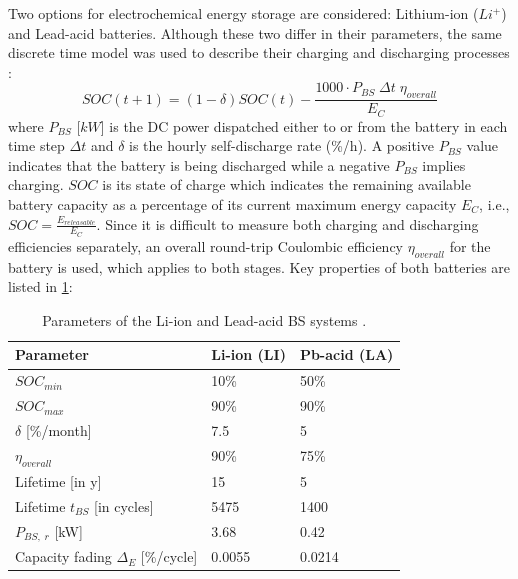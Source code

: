 \documentclass[final,3p,times]{elsarticle}
\begin{document}
Two options for electrochemical energy storage are considered: Lithium-ion ($Li^+$) and Lead-acid batteries. Although these two differ in their parameters, the same discrete time model was used to describe their charging and discharging processes \cite{tazvinga2014}:
\begin{equation}
    SOC(t+1) = (1-\delta) SOC(t) - \frac{1000 \cdot P_{BS} \; \Delta t \; \eta_{overall}}{E_C}
\end{equation}
where $P_{BS}$ [$kW$] is the DC power dispatched either to or from the battery in each time step $\Delta t$ and $\delta$ is the hourly self-discharge rate (\%/h). A positive $P_{BS}$ value indicates that the battery is being discharged while a negative $P_{BS}$ implies charging. $SOC$ is its state of charge which indicates the remaining available battery capacity as a percentage of its current maximum energy capacity $E_C$, i.e., $SOC = \frac{E_{releasable}}{E_C}$. Since it is difficult to measure both charging and discharging efficiencies separately, an overall round-trip Coulombic efficiency $\eta_{overall}$ for the battery is used, which applies to both stages. Key properties of both batteries are listed in \cref{tab:bs_params}:

\begin{table}[htbp]
\centering
\begin{tabular}{@{}lll@{}}
\toprule
\textbf{Parameter}               & \textbf{Li-ion (LI)} & \textbf{Pb-acid (LA)} \\ \midrule
$SOC_{min}$                         & 10\%            & 50\%             \\
$SOC_{max}$                         & 90\%            & 90\%             \\
$\delta$ [\%/month] & 7.5             & 5                \\
$\eta_{overall}$     & 90\%            & 75\%               \\
Lifetime [in y]                  & 15              & 5                \\
Lifetime $t_{BS}$ [in cycles]             & 5475            & 1400             \\
$P_{BS, \; r}$ [kW]                    & 3.68            & 0.42             \\
Capacity fading $\Delta_E$ [\%/cycle]       & 0.0055          & 0.0214           \\ \bottomrule
\end{tabular}
\caption{Parameters of the Li-ion and Lead-acid BS systems \cite{bs_source}.}
\label{tab:bs_params} 
\end{table}
\end{document}
